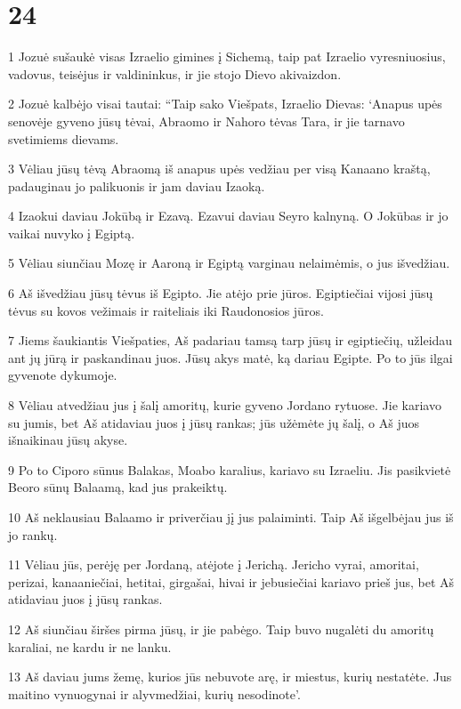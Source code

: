 \chapter{24}

\par 1 Jozuė sušaukė visas Izraelio gimines į Sichemą, taip pat Izraelio vyresniuosius, vadovus, teisėjus ir valdininkus, ir jie stojo Dievo akivaizdon. 
\par 2 Jozuė kalbėjo visai tautai: “Taip sako Viešpats, Izraelio Dievas: ‘Anapus upės senovėje gyveno jūsų tėvai, Abraomo ir Nahoro tėvas Tara, ir jie tarnavo svetimiems dievams. 
\par 3 Vėliau jūsų tėvą Abraomą iš anapus upės vedžiau per visą Kanaano kraštą, padauginau jo palikuonis ir jam daviau Izaoką. 
\par 4 Izaokui daviau Jokūbą ir Ezavą. Ezavui daviau Seyro kalnyną. O Jokūbas ir jo vaikai nuvyko į Egiptą. 
\par 5 Vėliau siunčiau Mozę ir Aaroną ir Egiptą varginau nelaimėmis, o jus išvedžiau. 
\par 6 Aš išvedžiau jūsų tėvus iš Egipto. Jie atėjo prie jūros. Egiptiečiai vijosi jūsų tėvus su kovos vežimais ir raiteliais iki Raudonosios jūros. 
\par 7 Jiems šaukiantis Viešpaties, Aš padariau tamsą tarp jūsų ir egiptiečių, užleidau ant jų jūrą ir paskandinau juos. Jūsų akys matė, ką dariau Egipte. Po to jūs ilgai gyvenote dykumoje. 
\par 8 Vėliau atvedžiau jus į šalį amoritų, kurie gyveno Jordano rytuose. Jie kariavo su jumis, bet Aš atidaviau juos į jūsų rankas; jūs užėmėte jų šalį, o Aš juos išnaikinau jūsų akyse. 
\par 9 Po to Ciporo sūnus Balakas, Moabo karalius, kariavo su Izraeliu. Jis pasikvietė Beoro sūnų Balaamą, kad jus prakeiktų. 
\par 10 Aš neklausiau Balaamo ir priverčiau jį jus palaiminti. Taip Aš išgelbėjau jus iš jo rankų. 
\par 11 Vėliau jūs, perėję per Jordaną, atėjote į Jerichą. Jericho vyrai, amoritai, perizai, kanaaniečiai, hetitai, girgašai, hivai ir jebusiečiai kariavo prieš jus, bet Aš atidaviau juos į jūsų rankas. 
\par 12 Aš siunčiau širšes pirma jūsų, ir jie pabėgo. Taip buvo nugalėti du amoritų karaliai, ne kardu ir ne lanku. 
\par 13 Aš daviau jums žemę, kurios jūs nebuvote arę, ir miestus, kurių nestatėte. Jus maitino vynuogynai ir alyvmedžiai, kurių nesodinote’. 

